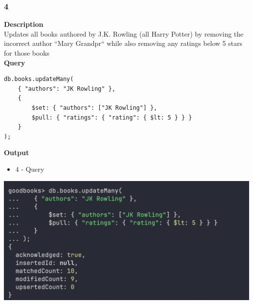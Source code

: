 \documentclass[11pt]{article}
\begin{document}
\subsubsection{4}
\label{sec:org611c19a}
\textbf{Description}\\
Updates all books authored by J.K. Rowling (all Harry Potter) by removing the incorrect author “Mary Grandpr`` while also removing any ratings below 5 stars for those books\\
\linebreak
\textbf{Query}
\begin{verbatim}
db.books.updateMany(
    { "authors": "JK Rowling" },
    {
        $set: { "authors": ["JK Rowling"] },
        $pull: { "ratings": { "rating": { $lt: 5 } } }
    }
);
\end{verbatim}

\linebreak
\textbf{Output}\\

\begin{itemize}
\item 4 - Query
\end{itemize}
\begin{center}
\includegraphics[width=1\textwidth]{images/KFWJOR001/4-query.png}
\end{center}
\end{document}
